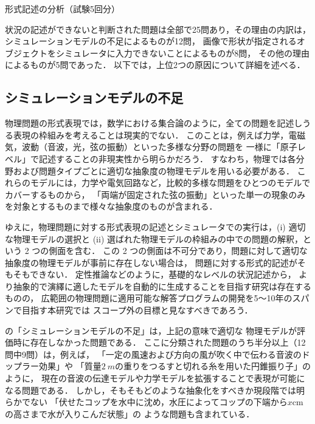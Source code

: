 \documentclass[japanese]{jnlp_1.4b}
\def\TABREF#1{}
\begin{document}
\begin{table}[b]
\caption{形式記述の分析（試験5回分）}
\label{fig:butsuri:mondaibunrui}

\end{table}

  状況の記述ができないと判断された問題は全部で25問あり，その理由の内訳は，
  シミュレーションモデルの不足によるものが12問，
  画像で形状が指定されるオブジェクトをシミュレータに入力できないことによるものが8問，
  その他の理由によるものが5問であった．
  以下では，上位2つの原因について詳細を述べる．

  

\subsection{シミュレーションモデルの不足}
\label{sec:butsuri:complicated}

  物理問題の形式表現では，数学における集合論のように，全ての問題を記述しうる表現の枠組みを考えることは現実的でない．
  このことは，例えば力学，電磁気，波動（音波，光，弦の振動）といった多様な分野の問題を
  一様に「原子レベル」で記述することの非現実性から明らかだろう．
  すなわち，物理では各分野および問題タイプごとに適切な抽象度の物理モデルを用いる必要がある．
  これらのモデルには，力学や電気回路など，比較的多様な問題をひとつのモデルでカバーするものから，
  「両端が固定された弦の振動」といった単一の現象のみを対象とするものまで様々な抽象度のものが含まれる．

  ゆえに，物理問題に対する形式表現の記述とシミュレータでの実行は，(i) 適切な物理モデルの選択と 
  (ii) 選ばれた物理モデルの枠組みの中での問題の解釈，という 2 つの側面を含む．
  この 2 つの側面は不可分であり，問題に対して適切な抽象度の物理モデルが事前に存在しない場合は，
  問題に対する形式的記述がそもそもできない．
  定性推論\cite{forbus1984}などのように，基礎的なレベルの状況記述から，
  より抽象的で演繹に適したモデルを自動的に生成することを目指す研究は存在するものの，
  広範囲の物理問題に適用可能な解答プログラムの開発を5〜10年のスパンで目指す本研究では
  スコープ外の目標と見なすべきであろう．

  \TABREF{tab:butsuri:riyuu}の「シミュレーションモデルの不足」は，上記の意味で適切な
  物理モデルが評価時に存在しなかった問題である．
  ここに分類された問題のうち半分以上（12問中9問）は，例えば，
  「一定の風速および方向の風が吹く中で伝わる音波のドップラー効果」や
  「質量$2~m$の重りをつるすと切れる糸を用いた円錐振り子」のように，
  現在の音波の伝達モデルや力学モデルを拡張することで表現が可能になる問題である．
  しかし，そもそもどのような抽象化をすべきか現段階では明らかでない
  「伏せたコップを水中に沈め，水圧によってコップの下端から$x$cmの高さまで水が入りこんだ状態」の
  ような問題も含まれている．
\end{document}
